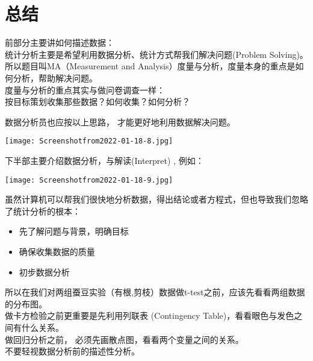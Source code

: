 
\hypertarget{ux603bux7ed3}{%
\section{总结}\label{ux603bux7ed3}}

前部分主要讲如何描述数据：\\
统计分析主要是希望利用数据分析、统计方式帮我们解决问题(Problem
Solving)。所以题目叫MA（Measurement and
Analysis）度量与分析，度量本身的重点是如何分析，帮助解决问题。\\
度量与分析的重点其实与做问卷调查一样：\\
按目标策划收集那些数据？如何收集？如何分析？

数据分析员也应按以上思路， 才能更好地利用数据解决问题。

\texttt{[image: Screenshotfrom2022-01-18-8.jpg]}

下半部主要介绍数据分析，与解读(Interpret) , 例如：

\texttt{[image: Screenshotfrom2022-01-18-9.jpg]}

虽然计算机可以帮我们很快地分析数据，得出结论或者方程式，但也导致我们忽略了统计分析的根本：

\begin{itemize}
\tightlist
\item
  先了解问题与背景，明确目标
\item
  确保收集数据的质量
\item
  初步数据分析\\
\end{itemize}

所以在我们对两组蚕豆实验（有根,剪枝）数据做t-test之前，应该先看看两组数据的分布图。\\
做卡方检验之前更重要是先利用列联表 (Contingency
Table)，看看眼色与发色之间有什么关系。\\
做回归分析之前， 必须先画散点图，看看两个变量之间的关系。\\
不要轻视数据分析前的描述性分析。

